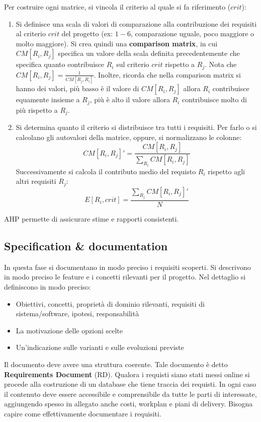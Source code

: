 Per costruire ogni matrice, si vincola il criterio al quale si fa riferimento ($crit$):
\begin{enumerate}
      \item Si definisce una scala di valori di comparazione alla contribuzione dei requisiti al 
            criterio $crit$ del progetto (ex: $1-6$, comparazione uguale, poco maggiore o molto maggiore). 
            Si crea quindi una \textbf{comparison matrix}, in cui $CM[R_i,R_j]$
            specifica un valore della scala definita precedentemente che specifica
            quanto contribuisce $R_i$ sul criterio $crit$ rispetto a $R_j$.
            Nota che $CM[R_i, R_j] = \frac{1}{CM[R_j, R_i]}$. Inoltre, ricorda che
            nella comparison matrix si hanno dei valori, più basso è il valore
            di $CM[R_i, R_j] $ allora $R_i$ contribuisce equamente insieme a $R_j$, più
            è alto il valore allora $R_i$ contribuisce molto di più rispetto a $R_j$.
      \item Si determina quanto il criterio si distribuisce tra tutti i requisiti.
            Per farlo o si calcolano gli autovalori della matrice, oppure, si 
            normalizzano le colonne:
            \begin{equation}
                  CM[R_i, R_j]' = \frac{CM[R_i, R_j]}{\sum_{R_i} CM[R_i, R_j]}
            \end{equation}
            Successivamente si calcola il contributo medio del requisto $R_i$
            rispetto agli altri requisiti $R_j$:
            \begin{equation}
                  E[R_i, crit] = \frac{\sum_{R_j} CM[R_i, R_j]'}{N}
            \end{equation}
\end{enumerate}
AHP permette di assicurare stime e rapporti consistenti.
\subsection{Specification \& documentation}
In questa fase si documentano in modo preciso i requisiti scoperti. Si descrivono
in modo preciso le feature e i concetti rilevanti per il progetto. Nel dettaglio
si definiscono in modo preciso:
\begin{itemize}
      \item Obiettivi, concetti, proprietà di dominio rilevanti, requisiti di
            sistema/software, ipotesi, responsabilità
      \item La motivazione delle opzioni scelte
      \item Un'indicazione sulle varianti e sulle evoluzioni previste
\end{itemize}
Il documento deve avere una struttura coerente. Tale documento è detto
\textbf{Requirements Document} (RD). Qualora i requisti siano stati messi online
si procede alla costruzione di un database che tiene traccia dei requisti. In
ogni caso il contenuto deve essere accessibile e comprensibile da tutte le parti
di interessate, aggiungendo spesso in allegato anche costi, workplan e piani di
delivery. Bisogna capire come effettivamente documentare i requisiti.
